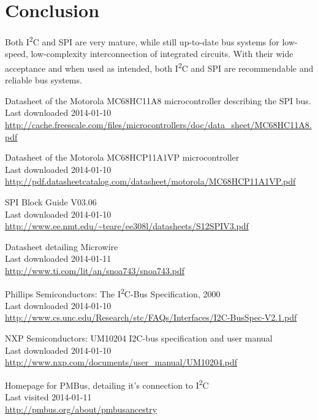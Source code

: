 \documentclass[journal]{IEEEtran}
\newcommand{\twi}{I\textsuperscript{2}C\xspace}
\begin{document}
		\medskip
\section{Conclusion}
Both \twi and SPI are very mature, while still up-to-date bus systems for low-speed, low-complexity interconnection of integrated circuits.
With their wide acceptance and when used as intended, both \twi and SPI are recommendable and reliable bus systems.


\bigskip

\begin{thebibliography}{1}

		Datasheet of the Motorola MC68HC11A8 microcontroller describing the SPI bus.\\
		Last downloaded 2014-01-10\\
		\url{http://cache.freescale.com/files/microcontrollers/doc/data_sheet/MC68HC11A8.pdf}
		\medskip

		Datasheet of the Motorola MC68HCP11A1VP microcontroller\\
		Last downloaded 2014-01-10\\
		\url{http://pdf.datasheetcatalog.com/datasheet/motorola/MC68HCP11A1VP.pdf}
		\medskip

		SPI Block Guide V03.06\\
		Last downloaded 2014-01-10\\
		\url{http://www.ee.nmt.edu/~teare/ee308l/datasheets/S12SPIV3.pdf}
		\medskip

		Datasheet detailing Microwire\\
		Last downloaded 2014-01-11\\
		\url{http://www.ti.com/lit/an/snoa743/snoa743.pdf}
		\medskip

		Phillips Semiconductors: The \twi-Bus Specification, 2000\\
		Last downloaded 2014-01-10\\
		\url{http://www.cs.unc.edu/Research/stc/FAQs/Interfaces/I2C-BusSpec-V2.1.pdf}
		\medskip

		NXP Semiconductors: UM10204 I2C-bus specification and user manual\\
		Last downloaded 2014-01-10\\
		\url{http://www.nxp.com/documents/user_manual/UM10204.pdf}
		\medskip

		Homepage for PMBus, detailing it's connection to \twi\\
		Last visited 2014-01-11\\
		\url{http://pmbus.org/about/pmbusancestry}
		\medskip


\end{thebibliography}
\end{document}
